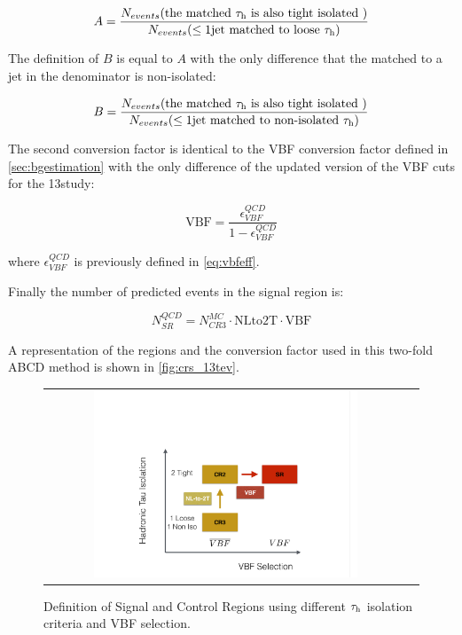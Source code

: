 \begin{equation}
A = \dfrac{N_{events}(\text{the matched }\tau_{\text{h}}\text{ is also tight isolated })}{N_{events}(\leq 1\text{jet matched to loose }\tau_{\text{h}})}
\end{equation}

The definition of $B$ is equal to $A$ with the only difference that the \hadtau matched to a jet in the denominator is non-isolated:

\begin{equation}
B = \dfrac{N_{events}(\text{the matched }\tau_{\text{h}}\text{ is also tight isolated })}{N_{events}(\leq 1\text{jet matched to non-isolated }\tau_{\text{h}})}
\end{equation}

The second conversion factor is identical to the VBF conversion factor defined in \autoref{sec:bgestimation} with the only difference of the updated version of the VBF cuts for the 13\tev study:

\begin{equation}
\text{VBF} = \frac{\epsilon^{QCD}_{VBF}}{1 - \epsilon^{QCD}_{VBF}}
\end{equation}

where $\epsilon^{QCD}_{VBF}$ is previously defined in \autoref{eq:vbfeff}. 

Finally the number of predicted events in the signal region is:

\begin{equation}
N^{QCD}_{SR} = N^{MC}_{CR3}  \cdot \text{NLto2T} \cdot \text{VBF}
\label{eq::qcdbgpred_13tev}
\end{equation}

A representation of the regions and the conversion factor used in this two-fold ABCD method is shown in \autoref{fig:crs_13tev}.

\begin{figure}[tbh!]
	\centering
	\begin{tabular}{cc}
		\includegraphics[width=0.75\textwidth]{PLOTS/diTauHadLSotherPlots/controlregions13TeV.pdf}
	\end{tabular}
	\caption{Definition of Signal and Control Regions using different $\tau_{\text{h}}$ isolation criteria and VBF selection.}
	\label{fig:crs_13tev}
\end{figure}

